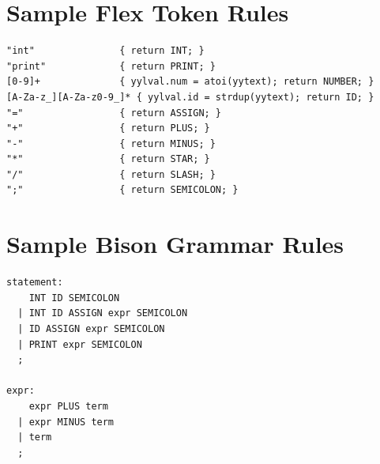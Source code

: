 \documentclass[12pt,a4paper]{report}
\begin{document}
\chapter{Sample Flex Token Rules}
\begin{lstlisting}
"int"               { return INT; }
"print"             { return PRINT; }
[0-9]+              { yylval.num = atoi(yytext); return NUMBER; }
[A-Za-z_][A-Za-z0-9_]* { yylval.id = strdup(yytext); return ID; }
"="                 { return ASSIGN; }
"+"                 { return PLUS; }
"-"                 { return MINUS; }
"*"                 { return STAR; }
"/"                 { return SLASH; }
";"                 { return SEMICOLON; }
\end{lstlisting}

\chapter{Sample Bison Grammar Rules}
\begin{lstlisting}
statement:
    INT ID SEMICOLON
  | INT ID ASSIGN expr SEMICOLON
  | ID ASSIGN expr SEMICOLON
  | PRINT expr SEMICOLON
  ;

expr:
    expr PLUS term
  | expr MINUS term
  | term
  ;
\end{lstlisting}
\end{document}
